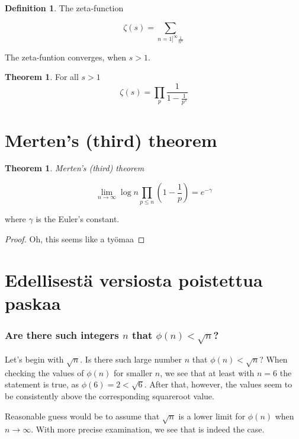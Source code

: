 \documentclass{article}
\theoremstyle{definition}
\newtheorem{definition}[subsection]{Definition}
\newtheorem{theorem}[subsection]{Theorem}
\begin{document}
\begin{definition}{The zeta-function}

\begin{equation*}
    \zeta(s) = \sum_{n=1]^\infty \frac{1}{n^s}}
\end{equation*}

The zeta-funtion converges, when $s>1$.

\begin{theorem}
\label{lemma:zeta}
For all $s>1$
\begin{equation*}
    \zeta(s) = \prod_p \frac{1}{1-\frac{1}{p^s}}
\end{equation*}
\end{theorem}

\end{definition}

\section{Merten's (third) theorem}

\begin{theorem}{\emph{Merten's (third) theorem}}

\begin{equation*}
    \lim_{n \rightarrow \infty} \log n \prod_{p\leq n} \left(1-\frac{1}{p}\right) = e^{-\gamma}
\end{equation*}

where $\gamma$ is the Euler's constant.

\begin{proof}

Oh, this seems like a työmaa

\end{proof}

\end{theorem}

\section{Edellisestä versiosta poistettua paskaa}

\subsubsection{Are there such integers $n$ that $\phi(n) < \sqrt{n}$?}

Let's begin with $\sqrt{n}$. Is there such large number $n$ that $\phi(n) < \sqrt{n}$? When checking the values of $\phi(n)$ for smaller $n$, we see that at least with $n=6$ the statement is true, as $\phi(6)=2<\sqrt{6}$. After that, however, the values seem to be consistently above the corresponding squareroot value.

Reasonable guess would be to assume that $\sqrt{n}$ is a lower limit for $\phi(n)$ when $n \rightarrow \infty$. With more precise examination, we see that is indeed the case.
\end{document}
